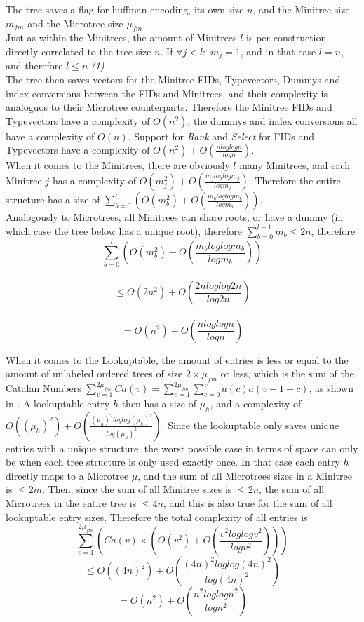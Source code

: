 \documentclass{article}
\begin{document}
The tree saves a flag for huffman encoding, its own size $n$, and the Minitree size $m_{fm}$ and the Microtree size $\mu_{fm}$.\\

Just as within the Minitrees, the amount of Minitrees $l$ is per construction directly correlated to the tree size $n$. If $\forall j < l:$ $m_{j} = 1$, and in that case $l = n$, and therefore $l \leq n$ \textit{(1)}\\

The tree then saves vectors for the Minitree FIDs, Typevectors, Dummys and index conversions between the FIDs and Minitrees, and their complexity is analoguos to their Microtree counterparts. Therefore the Minitree FIDs and Typevectors have a complexity of $O(n^2)$, the dummys and index conversions all have a complexity of $O(n)$.
Support for \textit{Rank} and \textit{Select} for FIDs and Typevectors have a complexity of $O(n^{2}) + O(\frac{n log log n}{log n})$.\\

When it comes to the Minitrees, there are obviously $l$ many Minitrees, and each Minitree $j$ has a complexity of $O(m_{j}^{2}) + O(\frac{m_{j} log log m_{j}}{log m_{j}})$.
Therefore the entire structure has a size of $\displaystyle \sum_{b=0}^{l} (O(m_{b}^{2}) + O(\frac{m_{b} log log m_{b}}{log m_{b}}))$.\\
Analogously to Microtrees, all Minitrees can share roots, or have a dummy (in which case the tree below has a unique root), therefore  $\sum_{b=0}^{l-1} m_{b} \leq 2n$,
therefore 
$$\displaystyle \sum_{b=0}^{l} (O(m_{b}^{2}) + O(\frac{m_{b} log log m_{b}}{log m_{b}}))$$\\ 
$$\leq \displaystyle O(2n^{2}) + O(\frac{2n log log 2n}{log 2n})$$\\ 
$$= O(n^{2}) + O(\frac{n log log n}{log n})$$

When it comes to the Lookuptable, the amount of entries is less or equal to the amount of unlabeled ordered trees of size $2 \times \mu_{fm}$ or less, which is the sum of the Catalan Numbers $\sum_{v=1}^{2\mu_{fm}} Ca(v) = \sum_{v=1}^{2\mu_{fm}} \sum_{c=0}^{v} a(c)a(v-1-c)$, as shown in \cite{catalanN}. A lookuptable entry $h$ then has a size of $\mu_{h}$, and a complexity of $O((\mu_{h})^{2}) + O(\frac{(\mu_{h})^{2} log log (\mu_{h})^{2}}{log (\mu_{h})^{2}})$. Since the lookuptable only saves unique entries with a unique structure, the worst possible case in terms of space can only be when each tree structure is only used exactly once. In that case each entry $h$ directly maps to a Microtree $\mu$, and the sum of all Microtrees sizes in a Minitree is $\leq 2m$. Then, since the sum of all Minitree sizes is $\leq 2n$, the sum of all Microtrees in the entire tree is $\leq 4n$, and this is also true for the sum of all lookuptable entry sizes.
Therefore the total complexity of all entries is
$$\sum_{v=1}^{2\mu_{fm}} (Ca(v) \times (O(v^{2}) + O(\frac{v^{2} log log v^{2}}{log v^{2}})))$$
$$\leq O((4n)^{2}) + O(\frac{(4n)^{2} log log (4n)^{2}}{log (4n)^{2}})$$
$$ = O(n^{2}) + O(\frac{n^{2} log log n^{2}}{log n^{2}})$$
\end{document}
